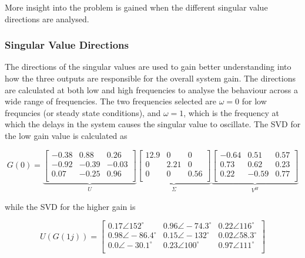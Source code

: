 More insight into the problem is gained when the different singular value directions are analysed. 

\subsubsection{Singular Value Directions}

The directions of the singular values are used to gain better understanding into how the three outputs are responsible for the overall system gain. The directions are calculated at both low and high frequencies to analyse the behaviour across a wide range of frequencies. The two frequencies selected are $\omega = 0$ for low frequncies (or steady state conditions), and $\omega = 1$, which is the frequency at which the delays in the system causes the singular value to oscillate. The SVD for the low gain value is calculated as

\begin{equation}
	G(0) = 
	\underbrace{
		\begin{bmatrix}
		-0.38 & 0.88 & 0.26\\
		-0.92 & -0.39 & -0.03\\
		0.07 & -0.25 & 0.96\\
		\end{bmatrix}
	}_{U}
	\underbrace{
		\begin{bmatrix}
		12.9 & 0 & 0\\
		0 & 2.21 & 0\\
		0 & 0 & 0.56\\
		\end{bmatrix}
	}_{\Sigma}
	\underbrace{
		\begin{bmatrix}
		-0.64 & 0.51 & 0.57 \\
		0.73 & 0.62 & 0.23 \\
		0.22 & -0.59 & 0.77\\
		\end{bmatrix}
	}_{V^H}
\end{equation}

while the SVD for the higher gain is 

\begin{equation}
U(G(1j)) = 
	\begin{bmatrix}
	0.17\angle152^{\circ} & 0.96\angle-74.3^{\circ} & 0.22\angle116^{\circ}\\
	0.98\angle-86.4^{\circ} & 0.15\angle-132^{\circ} & 0.02\angle58.3^{\circ}\\
	0.0\angle-30.1^{\circ} & 0.23\angle100^{\circ} & 0.97\angle111^{\circ}\\
	\end{bmatrix}
\end{equation}

